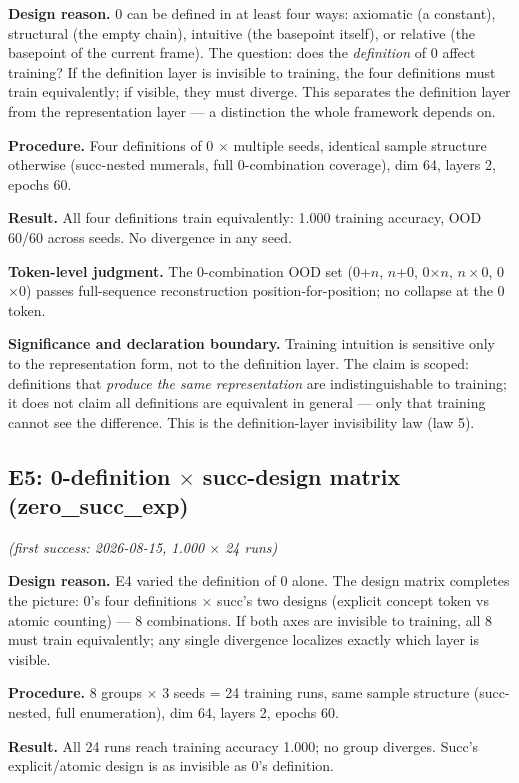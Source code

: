 \documentclass[sigplan,10pt,anonymous,review]{acmart}
\begin{document}
\textbf{Design reason.} 0 can be defined in at least four ways: axiomatic (a
constant), structural (the empty chain), intuitive (the basepoint itself),
or relative (the basepoint of the current frame). The question: does the
\emph{definition} of 0 affect training? If the definition layer is invisible
to training, the four definitions must train equivalently; if visible, they
must diverge. This separates the definition layer from the representation
layer --- a distinction the whole framework depends on.

\textbf{Procedure.} Four definitions of 0 $\times$ multiple seeds, identical
sample structure otherwise (succ-nested numerals, full 0-combination
coverage), dim 64, layers 2, epochs 60.

\textbf{Result.} All four definitions train equivalently: 1.000 training
accuracy, OOD 60/60 across seeds. No divergence in any seed.

\textbf{Token-level judgment.} The 0-combination OOD set (0+$n$, $n$+0,
0$\times n$, $n\times$0, 0$\times$0) passes full-sequence reconstruction
position-for-position; no collapse at the 0 token.

\textbf{Significance and declaration boundary.} Training intuition is
sensitive only to the representation form, not to the definition layer.
The claim is scoped: definitions that \emph{produce the same representation}
are indistinguishable to training; it does not claim all definitions are
equivalent in general --- only that training cannot see the difference.
This is the definition-layer invisibility law (law 5).

\subsection{E5: 0-definition $\times$ succ-design matrix (zero\_succ\_exp)}\hfill\textit{(first success: 2026-08-15, 1.000 $\times$ 24 runs)}

\textbf{Design reason.} E4 varied the definition of 0 alone. The design
matrix completes the picture: 0's four definitions $\times$ succ's two
designs (explicit concept token vs atomic counting) --- 8 combinations. If
both axes are invisible to training, all 8 must train equivalently; any
single divergence localizes exactly which layer is visible.

\textbf{Procedure.} 8 groups $\times$ 3 seeds = 24 training runs, same
sample structure (succ-nested, full enumeration), dim 64, layers 2, epochs
60.

\textbf{Result.} All 24 runs reach training accuracy 1.000; no group
diverges. Succ's explicit/atomic design is as invisible as 0's definition.
\end{document}
